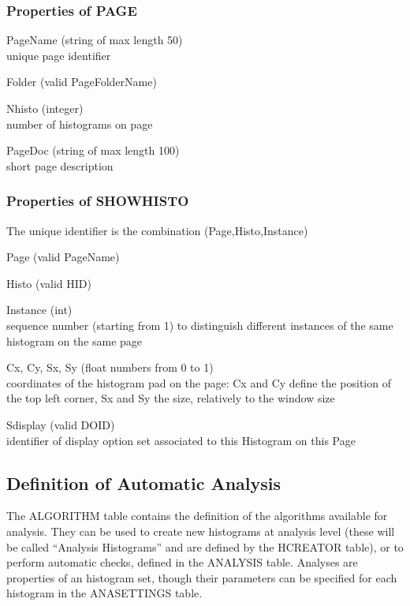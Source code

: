 \documentclass{lhcbnote}
\begin{document}
\subsubsection{Properties of PAGE}
\begin{description}
\item{PageName} (string of max length 50) \\
unique page identifier
\item{Folder} (valid PageFolderName) 
\item{Nhisto} (integer) \\
number of histograms on page
\item{PageDoc} (string of max length 100)\\
short page description
\end{description}

\subsubsection{Properties of SHOWHISTO}
The unique identifier is the combination (Page,Histo,Instance)
\begin{description}
\item{Page} (valid PageName)
\item{Histo} (valid HID)
\item{Instance} (int)\\
sequence number (starting from 1) to distinguish different instances
of the same histogram on the same page
\item{Cx, Cy, Sx, Sy} (float numbers from 0 to 1)\\
coordinates of the histogram pad on the page: Cx and Cy define the
position of the top left corner, Sx and Sy the size, relatively to the
window size
\item{Sdisplay} (valid DOID)\\
identifier of display option set associated to this Histogram on this Page
\end{description}

\subsection{Definition of Automatic Analysis}
The ALGORITHM table contains the definition of the algorithms
available for analysis. They can be used to create new histograms at
analysis level (these will be called ``Analysis Histograms'' and are
defined by the HCREATOR table), or to perform automatic checks,
defined in the ANALYSIS table. Analyses are properties of an histogram
set, though their parameters can be specified for each histogram in
the ANASETTINGS table.
\end{document}
